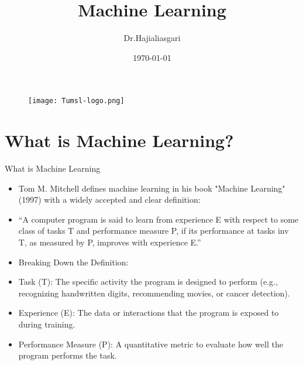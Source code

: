 \documentclass[serif, aspectratio=169]{beamer}
\author{Dr.Hajialiasgari}
\title{Machine Learning}
\institute{
    Tehran University \\
    Of\\
    Medical Science
}
\date{\small \today}
\begin{document}
\begin{frame}
    \titlepage
    \vspace*{-0.6cm}
    \begin{figure}[htpb]
        \begin{center}
            \texttt{[image: Tumsl-logo.png]}
        \end{center}
    \end{figure}
\end{frame}

\begin{frame}    
\tableofcontents[sectionstyle=show, subsectionstyle=show/shaded/hide, subsubsectionstyle=show/shaded/hide]
\end{frame}

\section{What is Machine Learning?}
\begin{frame}{What is Machine Learning}
    \begin{itemize}
        \item Tom M. Mitchell defines machine learning in his book "Machine Learning" (1997) with a widely accepted and clear definition:
    \item “A computer program is said to learn from experience E with respect to some class of tasks T and performance measure P, if its performance at tasks inv T, as measured by P, improves with experience E.”
    \end{itemize}
\end{frame}

\begin{frame}
    \begin{itemize}
        \item Breaking Down the Definition:
        \item Task (T): The specific activity the program is designed to perform (e.g., recognizing handwritten digits, recommending movies, or cancer detection).
        \item Experience (E): The data or interactions that the program is exposed to during training.
        \item Performance Measure (P): A quantitative metric to evaluate how well the program performs the task.
    \end{itemize}
\end{frame}
\end{document}
